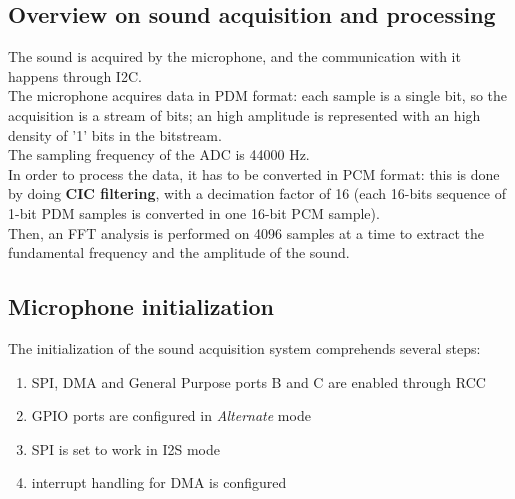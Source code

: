 \subsection{Overview on sound acquisition and processing}
The sound is acquired by the microphone, and the communication with it happens through I2C.\\
The microphone acquires data in PDM format: each sample is a single bit, so the acquisition is a stream of bits; an high amplitude is represented with an high density of '1' bits in the bitstream. \\
The sampling frequency of the ADC is 44000 Hz. \\
In order to process the data, it has to be converted in PCM format: this is done by doing \textbf{CIC filtering}, with a decimation factor of 16 (each 16-bits sequence of 1-bit PDM samples is converted in one 16-bit PCM sample).\\
Then, an FFT analysis is performed on 4096 samples at a time to extract the fundamental frequency and the amplitude of the sound.

\subsection{Microphone initialization}
The initialization of the sound acquisition system comprehends several steps:
\begin{enumerate}
	\item SPI, DMA and General Purpose ports B and C are enabled through RCC
	\item GPIO ports are configured in \textit{Alternate} mode
	\item SPI is set to work in I2S mode
	\item interrupt handling for DMA is configured
	
\end{enumerate}

